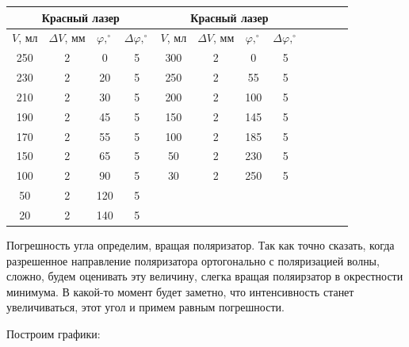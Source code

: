 \documentclass[14pt]{article}
\begin{document}
\begin{center}
\begin{tabular}{|c|c|c|c|c|c|c|c|c|c|c|c|}
\hline
\multicolumn{4}{|c|}{Красный лазер}	&	\multicolumn{4}{|c|}{Красный лазер}	\\
\hline
$V$, мл	&	$\Delta V$, мм	&	$\varphi, ^\circ$	&	$\Delta\varphi, ^\circ$	&	$V$, мл	&	$\Delta V$, мм	&	$\varphi, ^\circ$	&	$\Delta\varphi, ^\circ$		\\
\hline
250		&	2				&	0					&	5						&	300		&	2				&	0					&	5							\\
\hline
230		&	2				&	20					&	5						&	250		&	2				&	55					&	5							\\
\hline
210		&	2				&	30					&	5						&	200		&	2				&	100					&	5							\\
\hline
190		&	2				&	45					&	5						&	150		&	2				&	145					&	5							\\
\hline
170		&	2				&	55					&	5						&	100		&	2				&	185					&	5							\\
\hline
150		&	2				&	65					&	5						&	50		&	2				&	230					&	5							\\
\hline
100		&	2				&	90					&	5						&	30		&	2				&	250					&	5							\\
\hline
50		&	2				&	120					&	5						&			&					&						&								\\
\hline
20		&	2				&	140					&	5						&			&					&						&								\\
\hline
\end{tabular}
\end{center}

Погрешность угла определим, вращая поляризатор. Так как точно сказать, когда разрешенное направление поляризатора ортогонально с поляризацией волны, сложно, будем оценивать эту величину, слегка вращая поляирзатор в окрестности минимума. В какой-то момент будет заметно, что интенсивность станет увеличиваться, этот угол и примем равным погрешности. 

Построим графики:
\end{document}
